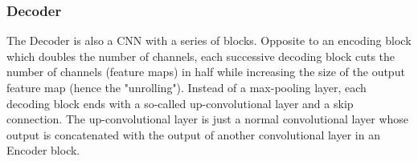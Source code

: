 \documentclass[12pt]{article}
\begin{document}


\subsubsection*{Decoder}


The Decoder is also a CNN with a series of blocks. Opposite to an encoding block which doubles the number of channels, each successive decoding block cuts the number of channels (feature maps) in half while increasing the size of the output feature map (hence the "unrolling").
Instead of a max-pooling layer, each decoding block ends with a so-called up-convolutional layer and a skip connection. 
The up-convolutional layer is just a normal convolutional layer whose output is concatenated with the output of another convolutional layer in an Encoder block. 




\end{document}
